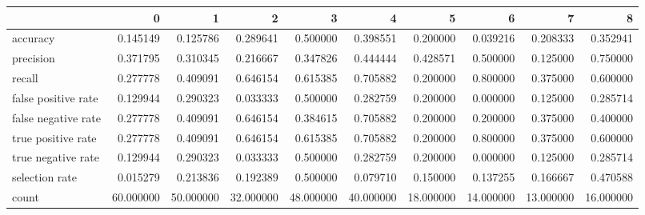 \begin{tabular}{lrrrrrrrrr}
\toprule
{} &          0 &          1 &          2 &          3 &          4 &          5 &          6 &          7 &          8 \\
\midrule
accuracy            &   0.145149 &   0.125786 &   0.289641 &   0.500000 &   0.398551 &   0.200000 &   0.039216 &   0.208333 &   0.352941 \\
precision           &   0.371795 &   0.310345 &   0.216667 &   0.347826 &   0.444444 &   0.428571 &   0.500000 &   0.125000 &   0.750000 \\
recall              &   0.277778 &   0.409091 &   0.646154 &   0.615385 &   0.705882 &   0.200000 &   0.800000 &   0.375000 &   0.600000 \\
false positive rate &   0.129944 &   0.290323 &   0.033333 &   0.500000 &   0.282759 &   0.200000 &   0.000000 &   0.125000 &   0.285714 \\
false negative rate &   0.277778 &   0.409091 &   0.646154 &   0.384615 &   0.705882 &   0.200000 &   0.200000 &   0.375000 &   0.400000 \\
true positive rate  &   0.277778 &   0.409091 &   0.646154 &   0.615385 &   0.705882 &   0.200000 &   0.800000 &   0.375000 &   0.600000 \\
true negative rate  &   0.129944 &   0.290323 &   0.033333 &   0.500000 &   0.282759 &   0.200000 &   0.000000 &   0.125000 &   0.285714 \\
selection rate      &   0.015279 &   0.213836 &   0.192389 &   0.500000 &   0.079710 &   0.150000 &   0.137255 &   0.166667 &   0.470588 \\
count               &  60.000000 &  50.000000 &  32.000000 &  48.000000 &  40.000000 &  18.000000 &  14.000000 &  13.000000 &  16.000000 \\
\bottomrule
\end{tabular}

